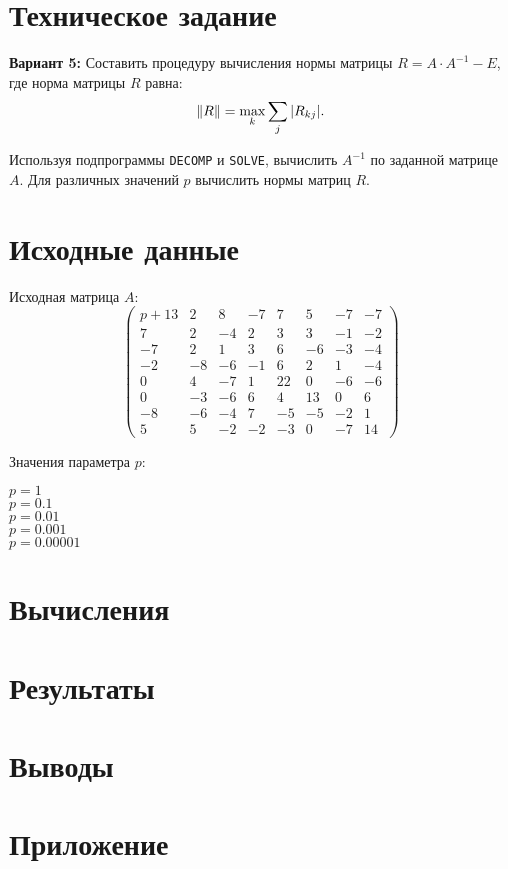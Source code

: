 





\section{Техническое задание}

\textbf{Вариант 5:} Составить процедуру вычисления нормы матрицы $R = A\cdot A^{-1} - E$, где норма матрицы $R$ равна:
\[
\left\lVert R\right\rVert = \max_k \sum_j |R_{kj}|.
\]

Используя подпрограммы \texttt{DECOMP} и \texttt{SOLVE}, вычислить $A^{-1}$ по заданной матрице $A$. Для различных значений $p$ вычислить нормы матриц $R$.

\section{Исходные данные}

Исходная матрица $A$:
\[
\begin{pmatrix}
  p+13 & 2  & 8  & -7 & 7  & 5  & -7 & -7 \\
  7    & 2  & -4 & 2  & 3  & 3  & -1 & -2 \\
  -7   & 2  & 1  & 3  & 6  & -6 & -3 & -4 \\
  -2   & -8 & -6 & -1 & 6  & 2  & 1  & -4 \\
  0    & 4  & -7 & 1  & 22 & 0  & -6 & -6 \\
  0    & -3 & -6 & 6  & 4  & 13 & 0  & 6  \\
  -8   & -6 & -4 & 7  & -5 & -5 & -2 & 1  \\
  5    & 5  & -2 & -2 & -3 & 0  & -7 & 14
\end{pmatrix}
\]

Значения параметра $p$:
\begin{multicols}{5} 
	$p = 1$ \\
	$p = 0.1$ \\
	$p = 0.01$ \\
	$p = 0.001$ \\
	$p = 0.00001$
\end{multicols}

\section{Вычисления}

\section{Результаты}

\section{Выводы}

\section*{Приложение}



